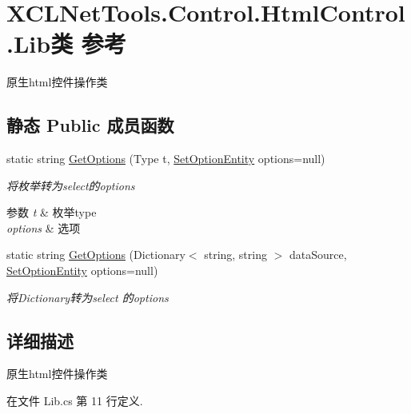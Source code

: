 \hypertarget{class_x_c_l_net_tools_1_1_control_1_1_html_control_1_1_lib}{\section{X\-C\-L\-Net\-Tools.\-Control.\-Html\-Control.\-Lib类 参考}
\label{class_x_c_l_net_tools_1_1_control_1_1_html_control_1_1_lib}
}


原生html控件操作类  


\subsection*{静态 Public 成员函数}
\begin{DoxyCompactItemize}
\item 
static string \hyperlink{class_x_c_l_net_tools_1_1_control_1_1_html_control_1_1_lib_a6bc535ff27a3e67b2c4dac1d5e99aa8c}{Get\-Options} (Type t, \hyperlink{class_x_c_l_net_tools_1_1_entity_1_1_set_option_entity}{Set\-Option\-Entity} options=null)
\begin{DoxyCompactList}\small\item\em 将枚举转为select的options 
\begin{DoxyParams}{参数}
{\em t} & 枚举type\\
\hline
{\em options} & 选项\\
\hline
\end{DoxyParams}
\end{DoxyCompactList}\item 
static string \hyperlink{class_x_c_l_net_tools_1_1_control_1_1_html_control_1_1_lib_aea5ab0601c97a418ef6291f75aa7baff}{Get\-Options} (Dictionary$<$ string, string $>$ data\-Source, \hyperlink{class_x_c_l_net_tools_1_1_entity_1_1_set_option_entity}{Set\-Option\-Entity} options=null)
\begin{DoxyCompactList}\small\item\em 将\-Dictionary转为select 的options \end{DoxyCompactList}\end{DoxyCompactItemize}


\subsection{详细描述}
原生html控件操作类 



在文件 Lib.\-cs 第 11 行定义.



